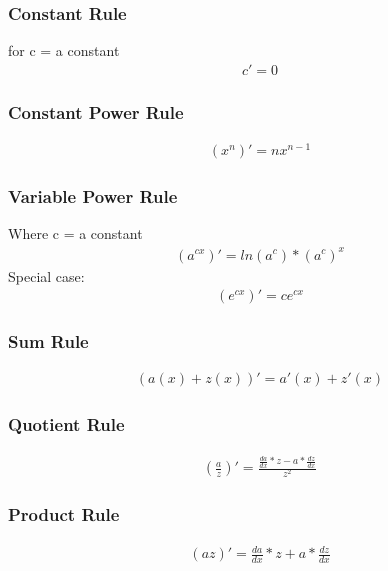 \documentclass{article}
\begin{document}
        \subsubsection{Constant Rule}
            for c = a constant
            \begin{gather*}
                c' = 0
            \end{gather*}
        \subsubsection{Constant Power Rule}
            \begin{gather*}
                (x^n)' = nx^{n-1}
            \end{gather*}
        \subsubsection{Variable Power Rule}
        Where c = a constant
            \begin{gather*}
                (a^{cx})' = ln(a^c) * \left(a^c\right)^x
            \end{gather*}
            Special case: 
            \begin{gather*}
                (e^{cx})' = ce^{cx}
            \end{gather*}
        \subsubsection{Sum Rule}
            \begin{gather*}
                (a(x) + z(x))' = a'(x) + z'(x)
            \end{gather*}
        \subsubsection{Quotient Rule}
            \begin{gather*}
                \left(\frac{a}{z}\right)' = \frac{\frac{da}{dx}*z-a*\frac{dz}{dx}}{z^2}
            \end{gather*}
        \subsubsection{Product Rule}
            \begin{gather*}
                (az)' = \frac{da}{dx}*z + a*\frac{dz}{dx}
            \end{gather*}
\end{document}
